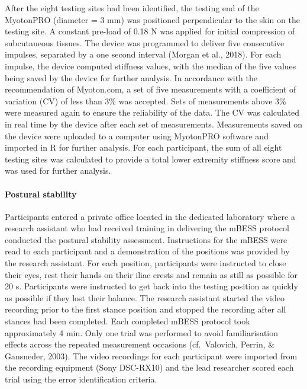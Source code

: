 \documentclass[man,floatsintext]{apa6}
\let\oldparagraph\paragraph
\renewcommand{\paragraph}[1]{\oldparagraph{#1}\mbox{}}
\begin{document}
After the eight testing sites had been identified, the testing end of the MyotonPRO (diameter = 3 mm) was positioned perpendicular to the skin on the testing site.
A constant pre-load of 0.18 N was applied for initial compression of subcutaneous tissues. The device was programmed to deliver five consecutive impulses, separated by a one second interval (Morgan et al., 2018).
For each impulse, the device computed stiffness values, with the median of the five values being saved by the device for further analysis.
In accordance with the recommendation of Myoton.com, a set of five measurements with a coefficient of variation (CV) of less than 3\% was accepted.
Sets of measurements above 3\% were measured again to ensure the reliability of the data.
The CV was calculated in real time by the device after each set of measurements.
Measurements saved on the device were uploaded to a computer using MyotonPRO software and imported in R for further analysis.
For each participant, the sum of all eight testing sites was calculated to provide a total lower extremity stiffness score and was used for further analysis.

\hypertarget{postural-stability-1}{%
\paragraph{Postural stability}\label{postural-stability-1}}

Participants entered a private office located in the dedicated laboratory where a research assistant who had received training in delivering the mBESS protocol conducted the postural stability assessment.
Instructions for the mBESS were read to each participant and a demonstration of the positions was provided by the research assistant.
For each position, participants were instructed to close their eyes, rest their hands on their iliac crests and remain as still as possible for 20 s.
Participants were instructed to get back into the testing position as quickly as possible if they lost their balance.
The research assistant started the video recording prior to the first stance position and stopped the recording after all stances had been completed.
Each completed mBESS protocol took approximately 4 min.
Only one trial was performed to avoid familiarisation effects across the repeated measurement occasions (cf.~Valovich, Perrin, \& Gansneder, 2003).
The video recordings for each participant were imported from the recording equipment (Sony DSC-RX10) and the lead researcher scored each trial using the error identification criteria.
\end{document}
